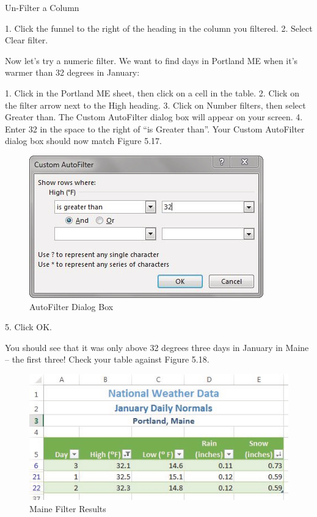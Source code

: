 Un-Filter a Column

1. Click the funnel to the right of the heading in the column you filtered.
2. Select Clear filter.



Now let's try a numeric filter. We want to find days in Portland ME when it’s warmer than 32
degrees in January:

1. Click in the Portland ME sheet, then click on a cell in the table.
2. Click on the filter arrow next to the High heading.
3. Click on Number filters, then select Greater than. The Custom AutoFilter dialog box will appear
on your screen.
4. Enter 32 in the space to the right of “is Greater than”. Your Custom AutoFilter dialog box should
now match Figure 5.17.


\begin{figure}[H]
	\centering
	\includegraphics[width=\maxwidth{.95\linewidth}]{gfx/ch05_fig17}
	\caption{AutoFilter Dialog Box}
	\label{05:fig17}
\end{figure}





5. Click OK.

You should see that it was only above 32 degrees three days in January in Maine – the first
three! Check your table against Figure 5.18.


\begin{figure}[H]
	\centering
	\includegraphics[width=\maxwidth{.95\linewidth}]{gfx/ch05_fig18}
	\caption{Maine Filter Results}
	\label{05:fig18}
\end{figure}





